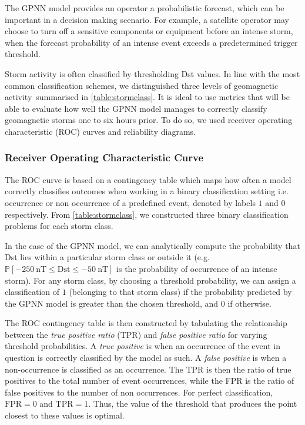 The GPNN model provides an operator a probabilistic forecast, which can be important in a decision 
making scenario. For example, a satellite operator may choose to turn off a sensitive components or 
equipment before an intense storm, when the forecast probability of an intense event exceeds a 
predetermined trigger threshold.

Storm activity is often classified by thresholding Dst values. In line with the most common 
classification schemes, we distinguished three levels of geomagnetic activity summarised in 
\cref{table:stormclass}. It is ideal to use metrics that will be able to evaluate how well the 
GPNN model manages to correctly classify geomagnetic storms one to six hours prior. To do so, 
we used receiver operating characteristic (ROC) curves and reliability diagrams.



\subsubsection{Receiver Operating Characteristic Curve}

The ROC curve is based on a contingency table which maps how often a model correctly classifies 
outcomes when working in a binary classification setting i.e. occurrence or non occurrence of a 
predefined event, denoted by labels $1$ and $0$ respectively. From \cref{table:stormclass}, we 
constructed three binary classification problems for each storm class.

In the case of the GPNN model, we can analytically compute the probability that Dst lies within a 
particular storm class or outside it 
(e.g. $\mathbb{P}[\SI{-250}{\nano\tesla} \leq \mathrm{Dst} \leq \SI{-50}{\nano\tesla}]$ is the 
probability of occurrence of an intense storm). For any storm class, by choosing a threshold 
probability, we can assign a classification of $1$ (belonging to that storm class) if the 
probability predicted by the GPNN model is greater than the chosen threshold, and $0$ if otherwise. 

The ROC contingency table is then constructed by tabulating the relationship between the 
\emph{true positive ratio} (TPR) and \emph{false positive ratio} for varying threshold 
probabilities. A \emph{true positive} is when an occurrence of the event in question is correctly 
classified by the model as such. A \emph{false positive} is when a non-occurrence is classified as 
an occurrence. The TPR is then the ratio of true positives to the total number of event 
occurrences, while the FPR is the ratio of false positives to the number of non occurrences. 
For perfect classification, $\mathrm{FPR} = 0$ and $\mathrm{TPR} = 1$. Thus, the value of the 
threshold that produces the point closest to these values is optimal.  

